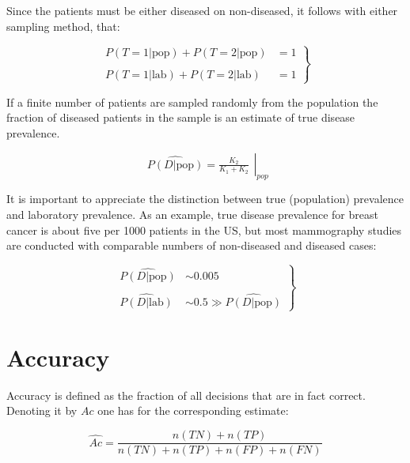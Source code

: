 \documentclass[
]{book}
\begin{document}
Since the patients must be either diseased on non-diseased, it follows with either sampling method, that:

\begin{equation} 
\left.\begin{aligned}
P(T=1|\text{pop})+P(T=2|\text{pop})&=1\\
\\
P(T=1|\text{lab})+P(T=2|\text{lab})&=1
\end{aligned}\right\}
\end{equation}

If a finite number of patients are sampled randomly from the population the fraction of diseased patients in the sample is an estimate of true disease prevalence.

\begin{equation} 
\left.\begin{matrix}
\widehat{P(D|\text{pop})}=
\frac{K_2}{K_1+K_2}
\end{matrix}\right|_{pop}
\label{eq:binary-taskDisPrevEst}
\end{equation}

It is important to appreciate the distinction between true (population) prevalence and laboratory prevalence. As an example, true disease prevalence for breast cancer is about five per 1000 patients in the US, but most mammography studies are conducted with comparable numbers of non-diseased and diseased cases:

\begin{equation} 
\left.\begin{aligned}
\widehat{P(D|\text{pop})}&\sim 0.005\\
\\
\widehat{P(D|\text{lab})}&\sim 0.5\gg \widehat{P(D|\text{pop})}
\end{aligned}\right\}
\label{eq:binary-taskDisPrevLabVsPop}
\end{equation}

\hypertarget{accuracy}{%
\section{Accuracy}\label{accuracy}}

Accuracy is defined as the fraction of all decisions that are in fact correct. Denoting it by \(Ac\) one has for the corresponding estimate:

\begin{equation} 
\widehat{Ac}=\frac{n(TN)+n(TP)}{n(TN)+n(TP)+n(FP)+n(FN)}
\label{eq:binary-taskAccuracyEst}
\end{equation}
\end{document}
